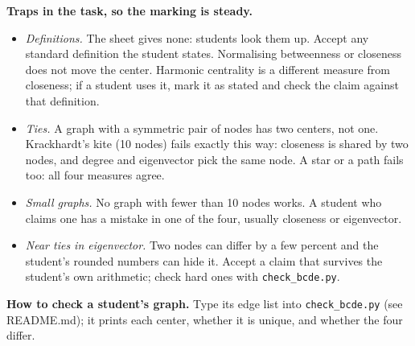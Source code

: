 \documentclass[a4paper, 11pt]{extarticle}
\begin{document}
\textbf{Traps in the task, so the marking is steady.}
\begin{itemize}[leftmargin=1.4em, itemsep=0.1em, topsep=0.2em]
  \item \emph{Definitions.} The sheet gives none: students look them up. Accept
        any standard definition the student states. Normalising betweenness or
        closeness does not move the center. Harmonic centrality is a different
        measure from closeness; if a student uses it, mark it as stated and
        check the claim against that definition.
  \item \emph{Ties.} A graph with a symmetric pair of nodes has two centers, not
        one. Krackhardt's kite (10 nodes) fails exactly this way: closeness is
        shared by two nodes, and degree and eigenvector pick the same node.
        A star or a path fails too: all four measures agree.
  \item \emph{Small graphs.} No graph with fewer than 10 nodes works. A student
        who claims one has a mistake in one of the four, usually closeness or
        eigenvector.
  \item \emph{Near ties in eigenvector.} Two nodes can differ by a few percent
        and the student's rounded numbers can hide it. Accept a claim that
        survives the student's own arithmetic; check hard ones with
        \texttt{check\_bcde.py}.
\end{itemize}

\textbf{How to check a student's graph.} Type its edge list into
\texttt{check\_bcde.py} (see README.md); it prints each center, whether it is
unique, and whether the four differ.
\end{document}
